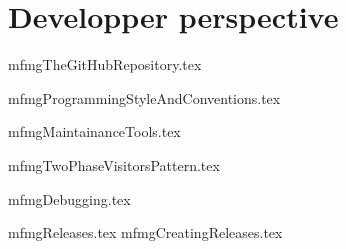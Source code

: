 



\part{Developper perspective}

{mfmgTheGitHubRepository.tex}

{mfmgProgrammingStyleAndConventions.tex}

{mfmgMaintainanceTools.tex}

{mfmgTwoPhaseVisitorsPattern.tex}

{mfmgDebugging.tex}

{mfmgReleases.tex}
{mfmgCreatingReleases.tex}
